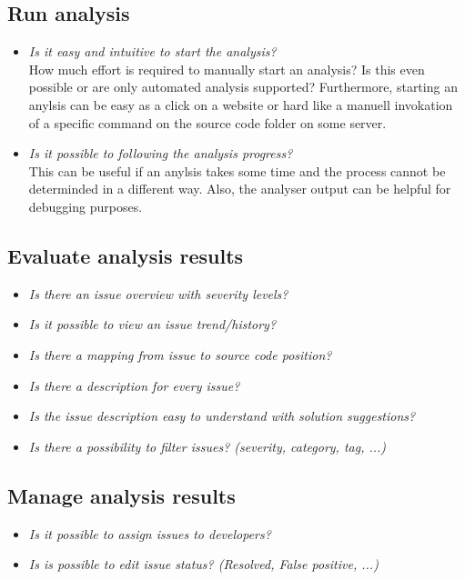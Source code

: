 \documentclass[conference]{IEEEtran}
\begin{document}
\subsection{Run analysis}
\begin{itemize}
	\item \textit{Is it easy and intuitive to start the analysis?} \\
	How much effort is required to manually start an analysis? Is this even possible or are only automated analysis supported? Furthermore, starting an anylsis can be easy as a click on a website or hard like a manuell invokation of a specific command on the source code folder on some server.
	
	\item \textit{Is it possible to following the analysis progress?} \\
	This can be useful if an anylsis takes some time and the process cannot be determinded in a different way. Also, the analyser output can be helpful for debugging purposes.
\end{itemize}


\subsection{Evaluate analysis results}
\begin{itemize}
	\item \textit{Is there an issue overview with severity levels?} \\
	\item \textit{Is it possible to view an issue trend/history?} \\
	\item \textit{Is there a mapping from issue to source code position?} \\
	\item \textit{Is there a description for every issue?} \\
	\item \textit{Is the issue description easy to understand with solution suggestions?} \\
	\item \textit{Is there a possibility to filter issues? (severity, category, tag, ...)} \\
\end{itemize}


\subsection{Manage analysis results}
\begin{itemize}
	\item \textit{Is it possible to assign issues to developers?} \\
	\item \textit{Is is possible to edit issue status? (Resolved, False positive, ...)} \\
\end{itemize}
\end{document}

